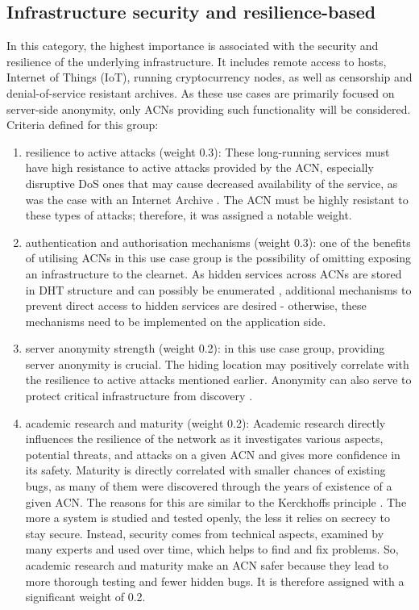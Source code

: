 \subsection{Infrastructure security and resilience-based}
In this category, the highest importance is associated with the security and resilience of the underlying infrastructure. It includes remote access to hosts, Internet of Things (IoT), running cryptocurrency nodes, as well as censorship and denial-of-service resistant archives. As these use cases are primarily focused on server-side anonymity, only ACNs providing such functionality will be considered. Criteria defined for this group:
\begin{enumerate}
    \item resilience to active attacks (weight 0.3): These long-running services must have high resistance to active attacks provided by the ACN, especially disruptive DoS ones that may cause decreased availability of the service, as was the case with an Internet Archive \cite{ddos-web-archive}. The ACN must be highly resistant to these types of attacks; therefore, it was assigned a notable weight.
    \item authentication and authorisation mechanisms (weight 0.3): one of the benefits of utilising ACNs in this use case group is the possibility of omitting exposing an infrastructure to the clearnet. As hidden services across ACNs are stored in DHT structure and can possibly be enumerated \cite{Owen2016}, additional mechanisms to prevent direct access to hidden services are desired - otherwise, these mechanisms need to be implemented on the application side.
    \item server anonymity strength (weight 0.2): in this use case group, providing server anonymity is crucial. The hiding location may positively correlate with the resilience to active attacks mentioned earlier. Anonymity can also serve to protect critical infrastructure from discovery \cite{torusers}.
    \item academic research and maturity (weight 0.2): Academic research directly influences the resilience of the network as it investigates various aspects, potential threats, and attacks on a given ACN and gives more confidence in its safety. Maturity is directly correlated with smaller chances of existing bugs, as many of them were discovered through the years of existence of a given ACN. The reasons for this are similar to the Kerckhoffs principle \cite{kerckhoffs}. The more a system is studied and tested openly, the less it relies on secrecy to stay secure. Instead, security comes from technical aspects, examined by many experts and used over time, which helps to find and fix problems. So, academic research and maturity make an ACN safer because they lead to more thorough testing and fewer hidden bugs. It is therefore assigned with a significant weight of 0.2.
\end{enumerate}
